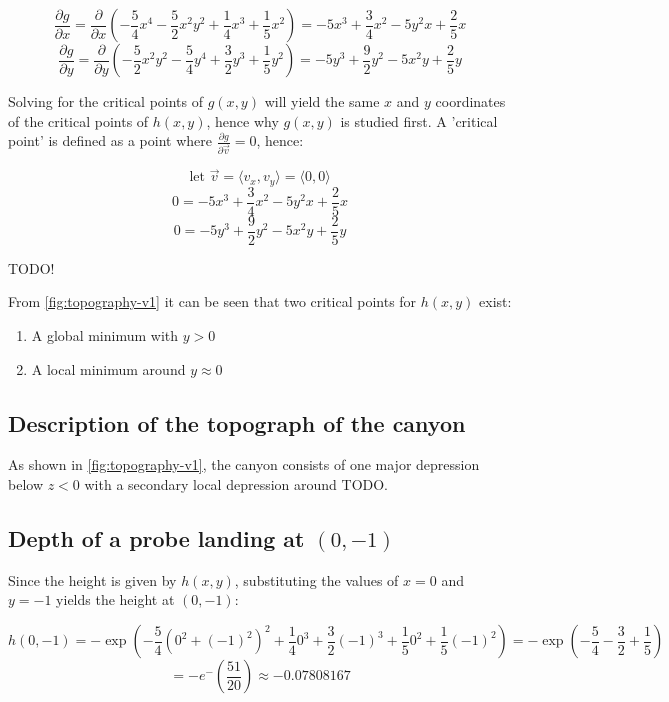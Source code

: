 \documentclass{article}
\begin{document}
\[
\frac{\partial g}{\partial x} = \frac{\partial}{\partial x} (-\frac{5}{4}x^{4}-\frac{5}{2}x^{2}y^{2}+\frac{1}{4}x^{3}+\frac{1}{5}x^{2}) = -5x^3 + \frac{3}{4} x^2 -5y^2 x + \frac{2}{5} x
\]
\[
\frac{\partial g}{\partial y} = \frac{\partial}{\partial y} (-\frac{5}{2}x^{2}y^{2}-\frac{5}{4}y^{4}+\frac{3}{2}y^{3}+\frac{1}{5}y^{2}) = - 5y^3 + \frac{9}{2}y^2 -5x^2 y + \frac{2}{5}y
\]

Solving for the critical points of $g(x,y)$ will yield the same $x$ and $y$ coordinates of the critical points of $h(x,y)$, hence why $g(x, y)$ is studied first.
A 'critical point' is defined as a point where $\frac{\partial g}{\partial \vec{v}} = 0$, hence:

\[
\text{let\ } \vec{v} = \langle v_x, v_y \rangle = \langle 0, 0 \rangle
\]
\[
0 = -5x^3 + \frac{3}{4} x^2 -5y^2 x + \frac{2}{5} x
\]
\[
0 = - 5y^3 + \frac{9}{2}y^2 -5x^2 y + \frac{2}{5}y
\]

TODO!

From \ref{fig:topography-v1} it can be seen that two critical points for $h(x,y)$ exist:
\begin{enumerate}
\item A global minimum with $y > 0$
\item A local minimum around $y \approx 0$
\end{enumerate}

\subsection{Description of the topograph of the canyon}

As shown in \ref{fig:topography-v1}, the canyon consists of one major depression below $z < 0$ with a secondary local depression around TODO.

\subsection{Depth of a probe landing at $(0, -1)$}

Since the height is given by $h(x,y)$, substituting the values of $x = 0$ and $y = -1$ yields the height at $(0, -1)$:

\[
h \left(0, -1\right)
= - \exp \left(- \frac{5}{4} \left(0^{2}+(-1)^{2}\right)^{2}+\frac{1}{4}0^{3}+\frac{3}{2}(-1)^{3}+\frac{1}{5}0^{2}+\frac{1}{5}(-1)^{2}\right)
= -\exp \left(- \frac{5}{4} -\frac{3}{2} + \frac{1}{5} \right)
\]
\[
= - e ^ -(\frac{51}{20})
\approx -0.07808167
\]
\end{document}
